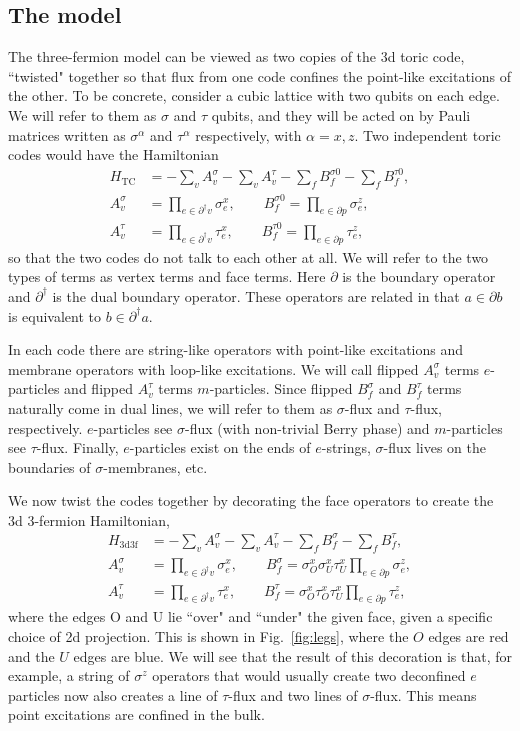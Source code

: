 \documentclass[twocolumn, longbibliography]{revtex4-2}
\newcommand{\TC}{\text{TC}}
\newcommand{\nn}{\nonumber\\}
\newcommand{\tdtf}{\text{3d3f}}
\newcommand{\pardag}{\partial^\dagger\!}
\begin{document}
\subsection{The model}

The three-fermion model can be viewed as two copies of the 3d toric code, ``twisted" together so that flux from one code confines the point-like excitations of the other. To be concrete, consider a cubic lattice with two qubits on each edge. We will refer to them as $\sigma$ and $\tau$ qubits, and they will be acted on by Pauli matrices written as $\sigma^\alpha$ and $\tau^\alpha$ respectively, with $\alpha = x,z$. Two independent toric codes would have the Hamiltonian 
\begin{align}
H_{\TC} &= -\sum_vA_v^{\sigma}-\sum_vA_v^{\tau}-\sum_fB_f^{\sigma0}-\sum_fB_f^{\tau0},\nn
A_v^{\sigma} &= \prod_{e\in \pardag v}\sigma_e^x, \qquad B_f^{\sigma0} = \prod_{e\in\partial p}\sigma_e^z,\nn
A_v^{\tau} &= \prod_{e\in \pardag v}\tau_e^x, \qquad B_f^{\tau0} = \prod_{e\in\partial p}\tau_e^z, \label{eqn:toric}
\end{align}
so that the two codes do not talk to each other at all. We will refer to the two types of terms as vertex terms and face terms. Here $\partial$ is the boundary operator and $\pardag$ is the dual boundary operator. These operators are related in that $a\in\partial b$ is equivalent to $b\in\pardag a$.
	
In each code there are string-like operators with point-like excitations and membrane operators with loop-like excitations. We will call flipped $A_v^\sigma$ terms $e$-particles and flipped $A_v^\tau$ terms $m$-particles. Since flipped $B_f^\sigma$ and $B_f^\tau$ terms naturally come in dual lines, we will refer to them as $\sigma$-flux and $\tau$-flux, respectively. $e$-particles see $\sigma$-flux (with non-trivial Berry phase) and $m$-particles see $\tau$-flux. Finally, $e$-particles exist on the ends of $e$-strings, $\sigma$-flux lives on the boundaries of $\sigma$-membranes, etc.

We now twist the codes together by decorating the face operators to create the 3d 3-fermion Hamiltonian,
\begin{align}
H_{\tdtf} &= -\sum_vA_v^{\sigma}-\sum_vA_v^{\tau}-\sum_fB_f^{\sigma}-\sum_fB_f^{\tau},\nn
A_v^{\sigma} &= \prod_{e\in \pardag v}\sigma_e^x, \qquad B_f^{\sigma} = \sigma_O^x\sigma_U^x\tau_U^x\prod_{e\in\partial p}\sigma_e^z,\nn
A_v^{\tau} &= \prod_{e\in \pardag v}\tau_e^x, \qquad B_f^{\tau} = \sigma^x_O\tau^x_O\tau^x_U\prod_{e\in\partial p}\tau_e^z, \label{eqn:3d3f}
\end{align}
where the edges O and U lie ``over" and ``under" the given face, given a specific choice of 2d projection. This is shown in Fig.~\ref{fig:legs}, where the $O$ edges are red and the $U$ edges are blue. We will see that the result of this decoration is that, for example, a string of $\sigma^z$ operators that would usually create two deconfined $e$ particles now also creates a line of $\tau$-flux and two lines of $\sigma$-flux. This means point excitations are confined in the bulk.
	
\end{document}
